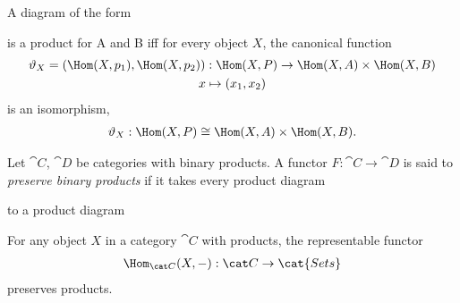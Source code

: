 \documentclass{article}
\begin{document}
\begin{proposition}[Awodey 2.20]
    A diagram of the form
    \begin{center}
    \end{center}
    is a product for A and B iff for every object $X$, the canonical
    function
    \begin{gather*}
        \vartheta_X = (\Hom(X, p_1), \Hom(X, p_2)) : \Hom(X, P)\to \Hom(X,A)\times \Hom(X,B)\\
        x \mapsto (x_1, x_2)
    \end{gather*}
    is an isomorphism,
    \begin{align*}
        \vartheta_X:\Hom(X,P)\cong \Hom(X,A)\times\Hom(X,B).
    \end{align*}
\end{proposition}

\begin{definition}[Awodey 2.21]
    Let $\cat C$, $\cat D$ be categories with binary products. A functor
    $F:\cat C\to \cat D$ is said to \emph{preserve binary products} if it takes
    every product diagram
    \begin{center}
    \end{center}
    to a product diagram
    \begin{center}
    \end{center}
\end{definition}

\begin{corollary}[Awodey 2.22]
    For any object $X$ in a category $\cat C$ with products, the representable
    functor
    \begin{align*}
        \Hom_{\cat C}(X, -) : \cat C \to \cat{Sets}
    \end{align*}
    preserves products.
\end{corollary}
\end{document}

